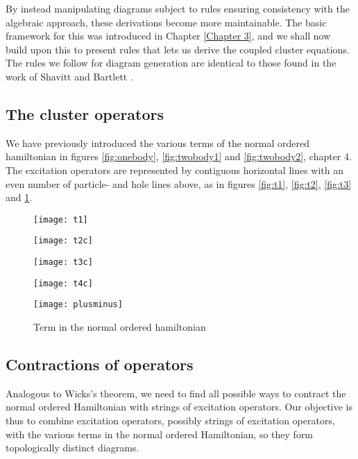 By instead manipulating diagrams subject to rules ensuring consistency with the algebraic approach, these derivations become more maintainable. The basic framework for this was introduced in Chapter \ref{Chapter 3}, and we shall now build upon this to present rules that lets us derive the coupled cluster equations. The rules we follow for diagram generation are identical to those found in the work of Shavitt and Bartlett \cite[p.297]{ShavittBartlett2009}.

\subsection{The cluster operators}

We have previously introduced the various terms of the normal ordered hamiltonian in figures \ref{fig:onebody}, \ref{fig:twobody1} and \ref{fig:twobody2}, chapter 4. The excitation operators are represented by contiguous horizontal lines with an even number of particle- and hole lines above, as in figures \ref{fig:t1}, \ref{fig:t2}, \ref{fig:t3} and \ref{fig:t4}.


\begin{figure}[!htb]
  \centering
  \texttt{[image: t1]}
  \caption{}\label{fig:t1}
\endminipage\hfill
{}
  \centering
  \texttt{[image: t2c]}
  \caption{}\label{fig:t2}
\endminipage\hfill
{}
  \centering
  \texttt{[image: t3c]}
  \caption{}\label{fig:t3}
\endminipage\hfill
{}
  \centering
  \texttt{[image: t4c]}
  \caption{}\label{fig:t4}
\endminipage\hfill
\end{figure}

\begin{figure}
 \centering
  \texttt{[image: plusminus]}
  \caption{Term in the normal ordered hamiltonian}\label{fig:plusminus}
\end{figure}

\subsection{Contractions of operators}

Analogous to Wicks's theorem, we need to find all possible ways to contract the normal ordered Hamiltonian with strings of excitation operators.  Our objective is thus to combine excitation operators, possibly strings of excitation operators, with the various terms in the normal ordered Hamiltonian, so they form topologically distinct diagrams. 

